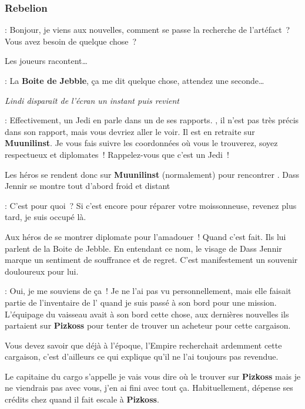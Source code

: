 \subsubsection{Rebelion}
\begin{quotebox}
    : Bonjour, je viens aux nouvelles, comment se passe la recherche de l’artéfact~? Vous avez besoin de quelque chose~?
\end{quotebox}

Les joueurs racontent\ldots

\begin{quotebox}
    : La \textbf{Boite de Jebble}, ça me dit quelque chose, attendez une seconde\ldots 

    \textit{Lindi disparaît de l’écran un instant puis revient}

    : Effectivement, un Jedi en parle dans un de ses rapports. , il n’est pas très précis dans son rapport, mais vous devriez aller le voir. Il est en retraite sur \textbf{Muunilinst}. Je vous fais suivre les coordonnées où vous le trouverez, soyez respectueux et diplomates~! Rappelez-vous que c’est un Jedi~!
\end{quotebox}

Les héros se rendent donc sur \textbf{Muunilinst} (normalement) pour rencontrer . Dass Jennir se montre tout d’abord froid et distant
\begin{quotebox}
    : C’est pour quoi~? Si c’est encore pour réparer votre moissonneuse, revenez plus tard, je suis occupé là.
\end{quotebox}

Aux héros de se montrer diplomate pour l’amadouer~! Quand c’est fait. Ils lui parlent de la Boite de Jebble. En entendant ce nom, le visage de Dass Jennir marque un sentiment de souffrance et de regret. C’est manifestement un souvenir douloureux pour lui.
\begin{quotebox}
    : Oui, je me souviens de ça~! Je ne l’ai pas vu personnellement, mais elle faisait partie de l’inventaire de l’ quand je suis passé à son bord pour une mission. L’équipage du vaisseau avait à son bord cette chose, aux dernières nouvelles ils partaient sur \textbf{Pizkoss} pour tenter de trouver un acheteur pour cette cargaison.

    Vous devez savoir que déjà à l’époque, l’Empire recherchait ardemment cette cargaison, c’est d’ailleurs ce qui explique qu’il ne l’ai toujours pas revendue. 

    Le capitaine du cargo s’appelle  je vais vous dire où le trouver sur \textbf{Pizkoss} mais je ne viendrais pas avec vous, j’en ai fini avec tout ça. Habituellement,  dépense ses crédits chez  quand il fait escale à \textbf{Pizkoss}.
\end{quotebox}

